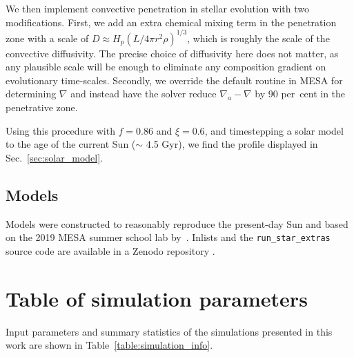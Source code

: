 \documentclass[twocolumn]{aastex631}
\begin{document}
We then implement convective penetration in stellar evolution with two modifications.
First, we add an extra chemical mixing term in the penetration zone with a scale of $D \approx H_p (L/4\pi r^2 \rho)^{1/3}$, which is roughly the scale of the convective diffusivity.
The precise choice of diffusivity here does not matter, as any plausible scale will be enough to eliminate any composition gradient on evolutionary time-scales.
Secondly, we override the default routine in MESA for determining $\nabla$ and instead have the solver reduce $\nabla_a-\nabla$ by 90 per~cent in the penetrative zone.

Using this procedure with $f = 0.86$ and $\xi = 0.6$, and timestepping a solar model to the age of the current Sun ($\sim$ 4.5 Gyr), we find the profile displayed in Sec.~\ref{sec:solar_model}.

\subsection{Models}

Models were constructed to reasonably reproduce the present-day Sun and based on the 2019 MESA summer school lab by~\citet{pm}.
Inlists and the \texttt{run\_star\_extras} source code are available in a Zenodo repository \citep{supp}.

\section{Table of simulation parameters}
\label{app:simulation_table}
Input parameters and summary statistics of the simulations presented in this work are shown in Table~\ref{table:simulation_info}.
\end{document}
